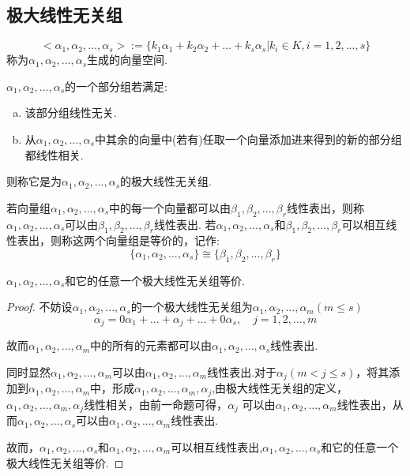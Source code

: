 \documentclass[blue,normal,cn]{elegantnote}
\begin{document}
\subsection{极大线性无关组}
\begin{definition}
    \begin{equation*}
        <α_1,α_2,...,α_s>:=\{k_1 α_1+k_2 α_2+...+k_s α_s|k_i∈ K,i=1,2,...,s\}
    \end{equation*}
称为$α_1,α_2,...,α_s$生成的向量空间.
\end{definition}


\begin{definition}
    $α_1,α_2,...,α_s$的一个部分组若满足:
    \begin{enumerate}[(a)]
        \item 该部分组线性无关.
        \item 从$α_1,α_2,...,α_s$中其余的向量中(若有)任取一个向量添加进来得到的新的部分组都线性相关.
    \end{enumerate}
    则称它是为$α_1,α_2,...,α_s$的极大线性无关组.
\end{definition}

\begin{definition}
    若向量组$α_1,α_2,...,α_s$中的每一个向量都可以由$β_1,β_2,...,β_r$线性表出，则称$α_1,α_2,...,α_s$可以由$β_1,β_2,...,β_r$线性表出.
    若$α_1,α_2,...,α_s$和$β_1,β_2,...,β_r$可以相互线性表出，则称这两个向量组是等价的，记作:
    \begin{equation*}
        \{α_1,α_2,...,α_s\} \cong \{β_1,β_2,...,β_r\}
    \end{equation*}
\end{definition}

\begin{proposition}
    $α_1,α_2,...,α_s$和它的任意一个极大线性无关组等价.
\end{proposition}

\begin{proof}
    不妨设$α_1,α_2,...,α_s$的一个极大线性无关组为$α_1,α_2,...,α_m(m≤s)$
    \begin{equation*}
        α_j=0α_1+...+α_j+...+0α_s,\quad j=1,2,...,m
    \end{equation*}

    故而$α_1,α_2,...,α_m$中的所有的元素都可以由$α_1,α_2,...,α_s$线性表出.

    同时显然$α_1,α_2,...,α_m$可以由$α_1,α_2,...,α_m$线性表出.对于$α_j(m<j≤s)$，将其添加到$α_1,α_2,...,α_m$中，形成$α_1,α_2,...,α_m,α_j$,由极大线性无关组的定义，$α_1,α_2,...,α_m,α_j$线性相关，由前一命题可得，$α_j$
    可以由$α_1,α_2,...,α_m$线性表出，从而$α_1,α_2,...,α_s$可以由$α_1,α_2,...,α_m$线性表出.

    故而，$α_1,α_2,...,α_s$和$α_1,α_2,...,α_m$可以相互线性表出,$α_1,α_2,...,α_s$和它的任意一个极大线性无关组等价.
\end{proof}
\end{document}
